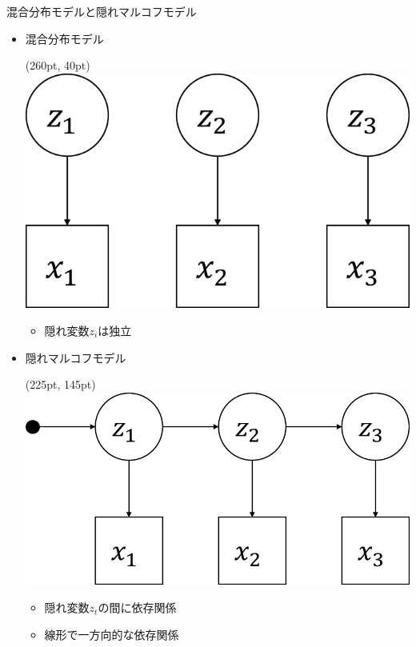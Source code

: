 \documentclass[aspectratio=169,unicode,dvipdfmx,14pt]{beamer}
\begin{document}
\begin{frame}{混合分布モデルと隠れマルコフモデル}
\begin{itemize}
\item 混合分布モデル
\begin{textblock*}{0.4\linewidth}(260pt, 40pt)
    \centering
    \includegraphics[width=\linewidth]{HMM1.jpg}
\end{textblock*}
\begin{itemize}
\item 隠れ変数$z_i$は独立
\end{itemize}
\vspace{1in}
\item 隠れマルコフモデル
\begin{textblock*}{0.4\linewidth}(225pt, 145pt)
    \centering
    \includegraphics[width=1.25\linewidth]{HMM2.jpg}
\end{textblock*}
\begin{itemize}
\item 隠れ変数$z_t$の間に依存関係
\item 線形で一方向的な依存関係
\end{itemize}
\end{itemize}
\end{frame}
\end{document}
